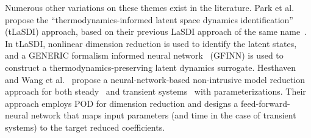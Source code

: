 \documentclass[3p,computermodern,11pt]{elsarticle}
\numberwithin{equation}{section}
\begin{document}
Numerous other variations on these themes exist in the literature. 
Park et al.~\cite{PaChCh24} propose the ``thermodynamics-informed latent space dynamics identification'' (tLaSDI) approach, based on their previous LaSDI approach of the same name~\cite{FrHeCh22}. In tLaSDI, nonlinear dimension reduction is used to identify the latent states, and a GENERIC formalism informed neural network~\cite{ZhShKa22} (GFINN) is used to construct a thermodynamics-preserving latent dynamics surrogate. Hesthaven and Wang et al.~\cite{HeUb18,WaHeRa19} propose a neural-network-based non-intrusive model reduction approach for both steady~\cite{HeUb18} and transient systems~\cite{WaHeRa19} with parameterizations. Their approach employs POD for dimension reduction and designs a feed-forward-neural network that maps input parameters (and time in the case of transient systems) to the target reduced coefficients. 
\end{document}
